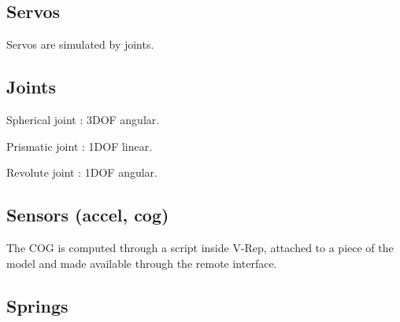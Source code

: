 \subsection{Servos}
Servos are simulated by joints.

\subsection{Joints}
Spherical joint : 3DOF angular.

Prismatic joint : 1DOF linear.

Revolute joint : 1DOF angular.

\subsection{Sensors (accel, cog)}
The COG is computed through a script inside V-Rep, attached to a piece of the model and made available through the remote interface.

\subsection{Springs}